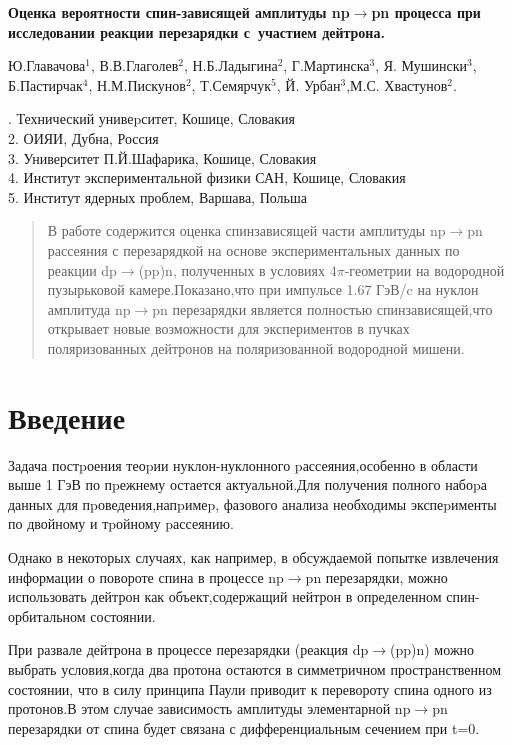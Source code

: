 \documentclass[a4paper,12pt]{article}
\begin{document}
\begin{center}
  \Large\bf{Оценка вероятности спин-зависящей амплитуды np$\to$pn процесса при
    исследовании реакции перезарядки с~участием дейтрона.}
\end{center}
Ю.Главачова$^1$, В.В.Глаголев$^2$, Н.Б.Ладыгина$^2$, Г.Мартинска$^3$,
Я. Мушински$^3$, Б.Пастирчак$^4$, Н.М.Пискунов$^2$, Т.Семярчук$^5$,
Й. Урбан$^3$,М.С. Хвастунов$^2$.

\bigskip
\small{
  . Технический унивеpситет, Кошице, Словакия \\
  2. ОИЯИ, Дубна, Россия \\
  3. Университет П.Й.Шафарика, Кошице, Словакия \\
  4. Институт экспериментальной физики САН, Кошице, Словакия \\
  5. Институт ядерных проблем, Варшава, Польша
}

\bigskip
\begin{abstract}
  В работе содержится оценка спинзависящей части амплитуды np$\to$pn рассеяния
  с перезарядкой на основе экспериментальных данных по реакции dp$\to$(pp)n,
  полученных в условиях 4$\pi$-геометрии на водородной пузырьковой
  камере.Показано,что при импульсе 1.67 ГэВ/c на нуклон амплитуда np$\to$pn
  перезарядки является полностью спинзависящей,что открывает новые возможности
  для экспериментов в пучках поляризованных дейтронов на поляризованной
  водородной мишени.
\end{abstract}

\section{Введение}
Задача постpоения теоpии нуклон-нуклонного pассеяния,особенно в области выше 1
ГэВ по пpежнему остается актуальной.Для получения полного набоpа данных для
пpоведения,напpимеp, фазового анализа необходимы экспеpименты по двойному и
тpойному pассеянию.

Однако в некоторых случаях, как например, в обсуждаемой попытке извлечения
информации о повороте спина в процессе np$\to$pn перезарядки, можно использовать
дейтрон как объект,содержащий нейтрон в определенном спин-орбитальном
состоянии.

При развале дейтрона в процессе перезарядки (реакция dp$\to$(pp)n) можно
выбрать условия,когда два протона остаются в симметричном пространственном
состоянии, что в силу принципа Паули приводит к перевороту спина одного из
протонов.В этом случае зависимость амплитуды элементарной np$\to$pn
перезарядки от спина будет связана с дифференциальным сечением при t=0.
\end{document}
